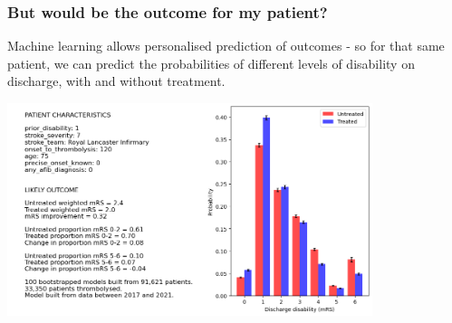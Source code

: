 \begin{frame}
\frametitle{But would be the outcome for my patient?}

Machine learning allows personalised prediction of outcomes - so for that same patient, we can predict the probabilities of different levels of disability on discharge, with and without treatment.

\vspace{5mm}

\begin{center}
\includegraphics[width=0.8\textwidth]{./images/choice_example_outcome}
\end{center}


\end{frame}